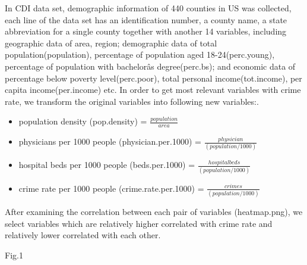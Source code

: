 \documentclass[preprint,12pt,3p]{elsarticle}
\begin{document}
In CDI data set, demographic information of 440 counties in US was collected, each line of the data set has an identification number, a county name, a state abbreviation for a single county together with another 14 variables, including geographic data of area, region; demographic data of total population(population), percentage of population aged 18-24(perc.young), percentage of population with bachelorâs degree(perc.bs); and economic data of percentage below poverty level(perc.poor), total personal income(tot.income), per capita income(per.income) etc. In order to get most relevant variables with crime rate, we transform the original variables into following new variables:.
\begin{itemize}
\setlength\itemsep{0em}
\item population density (pop.density) = $\frac{population}{area}$
\item physicians per 1000 people (physician.per.1000) = $\frac{physician}{(population/1000)}$
\item hospital beds per 1000 people (beds.per.1000) = $\frac{hospitalbeds}{(population/1000)}$
\item crime rate per 1000 people (crime.rate.per.1000) = $\frac{crimes}{(population/1000)}$
\end{itemize}

After examining the correlation between each pair of variables (heatmap.png), we select variables which are relatively higher correlated with crime rate and relatively lower correlated with each other.

\begin{center}
\caption{Fig.1}
\end{center}
\end{document}
